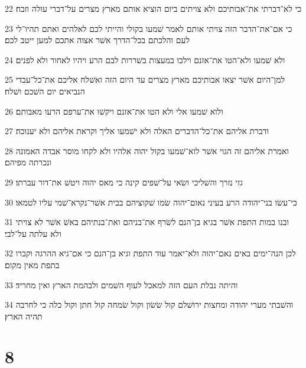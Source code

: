\par 22 כי לא־דברתי את־אבותיכם ולא צויתים ביום הוציא אותם מארץ מצרים על־דברי עולה וזבח׃
\par 23 כי אם־את־הדבר הזה צויתי אותם לאמר שׁמעו בקולי והייתי לכם לאלהים ואתם תהיו־לי לעם והלכתם בכל־הדרך אשׁר אצוה אתכם למען ייטב לכם׃
\par 24 ולא שׁמעו ולא־הטו את־אזנם וילכו במעצות בשׁררות לבם הרע ויהיו לאחור ולא לפנים׃
\par 25 למן־היום אשׁר יצאו אבותיכם מארץ מצרים עד היום הזה ואשׁלח אליכם את־כל־עבדי הנביאים יום השׁכם ושׁלח׃
\par 26 ולוא שׁמעו אלי ולא הטו את־אזנם ויקשׁו את־ערפם הרעו מאבותם׃
\par 27 ודברת אליהם את־כל־הדברים האלה ולא ישׁמעו אליך וקראת אליהם ולא יענוכה׃
\par 28 ואמרת אליהם זה הגוי אשׁר לוא־שׁמעו בקול יהוה אלהיו ולא לקחו מוסר אבדה האמונה ונכרתה מפיהם׃
\par 29 גזי נזרך והשׁליכי ושׂאי על־שׁפים קינה כי מאס יהוה ויטשׁ את־דור עברתו׃
\par 30 כי־עשׂו בני־יהודה הרע בעיני נאום־יהוה שׂמו שׁקוציהם בבית אשׁר־נקרא־שׁמי עליו לטמאו׃
\par 31 ובנו במות התפת אשׁר בגיא בן־הנם לשׂרף את־בניהם ואת־בנתיהם באשׁ אשׁר לא צויתי ולא עלתה על־לבי׃
\par 32 לכן הנה־ימים באים נאם־יהוה ולא־יאמר עוד התפת וגיא בן־הנם כי אם־גיא ההרגה וקברו בתפת מאין מקום׃
\par 33 והיתה נבלת העם הזה למאכל לעוף השׁמים ולבהמת הארץ ואין מחריד׃
\par 34 והשׁבתי מערי יהודה ומחצות ירושׁלם קול שׂשׂון וקול שׂמחה קול חתן וקול כלה כי לחרבה תהיה הארץ׃

\chapter{8}

